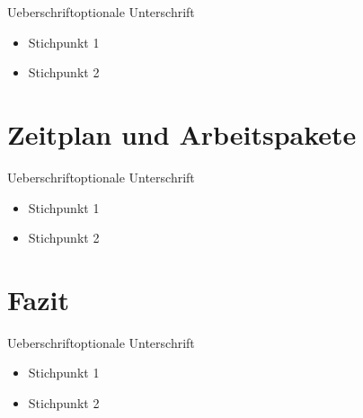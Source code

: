 \documentclass[11pt]{beamer}
\begin{document}
	\begin{frame}{Ueberschrift}{optionale Unterschrift}
		\begin{itemize}
			\item Stichpunkt 1
			\item Stichpunkt 2
		\end{itemize}
	\end{frame}
	
	\section{Zeitplan und Arbeitspakete}
	
	\begin{frame}{Ueberschrift}{optionale Unterschrift}
		\begin{itemize}
			\item Stichpunkt 1
			\item Stichpunkt 2
		\end{itemize}
	\end{frame}
	
	\section{Fazit}
	
	\begin{frame}{Ueberschrift}{optionale Unterschrift}
		\begin{itemize}
			\item Stichpunkt 1
			\item Stichpunkt 2
		\end{itemize}
	\end{frame}
\end{document}
